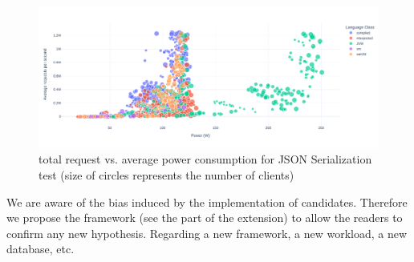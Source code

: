 \begin{figure}[hbt]
    \centering
    \includegraphics[width=\textwidth,height=\textheight,keepaspectratio]{imgs/power_requests_json}
    \caption{total request vs. average power consumption for JSON Serialization test (size of circles represents the number of clients)}
    \label{fig:power_requests_json}
\end{figure}

We are aware of the bias induced by the implementation of candidates. Therefore we propose the framework (see the part of the extension) to allow the readers to confirm any new hypothesis.
Regarding a new framework, a new workload, a new database, etc.

